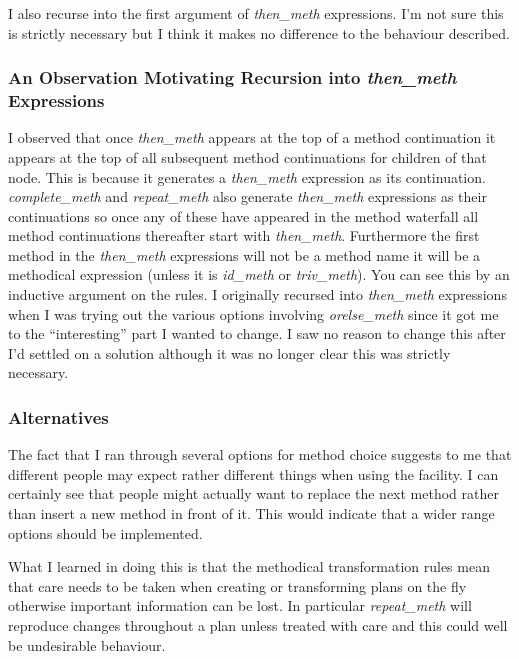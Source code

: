 I also recurse into the first argument of {\em then\_meth}
expressions.  I'm not sure this is strictly necessary but I think it
makes no difference to the behaviour described.

\subsubsection{An Observation Motivating Recursion into {\em then\_meth}
  Expressions} I observed that once {\em then\_meth}
appears at the top of a method continuation
it appears at the top of all subsequent method continuations for
children of that node.  This is because it generates a {\em
  then\_meth} expression as its continuation.  {\em
  complete\_meth} and {\em
  repeat\_meth} also generate {\em then\_meth}
expressions as their continuations so once any of these have appeared
in the method waterfall all method continuations thereafter start with
{\em then\_meth}.  Furthermore the first method in the {\em
  then\_meth} expressions will not be a method name it will be a
methodical expression (unless it is {\em id\_meth} or
{\em triv\_meth}).  You can see this by an inductive
argument on the rules.  I originally recursed into {\em then\_meth}
expressions when I was trying out the various options involving {\em
  orelse\_meth} since it got me to the ``interesting'' part I wanted
to change.  I saw no reason to change this after I'd settled on a
solution although it was no longer clear this was strictly necessary.

\subsubsection{Alternatives}
The fact that I ran through several options for method
choice suggests to me that different people may
expect rather different things when using the facility.  I can
certainly see that people might actually want to replace the next
method rather than insert a new method in front of it.  This would
indicate that a wider range options should be implemented.

What I learned in doing this is that the methodical
transformation rules mean that care
needs to be taken when creating or transforming plans on the fly
otherwise important information can be lost.  In particular {\em
  repeat\_meth} will reproduce changes throughout
a plan unless treated with care and this could well be undesirable
behaviour.


